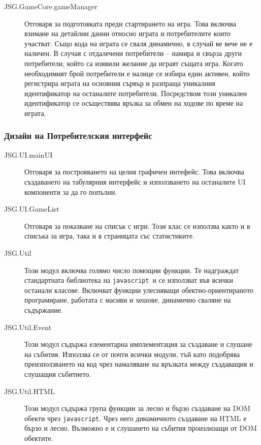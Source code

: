 \documentclass[a4paper]{article}
\def\js{\texttt{javascript}}
\begin{document}
\begin{description}
      \item[JSG.GameCore.gameManager] Отговаря за подготовката преди стартирането на игра. Това включва взимане на детайлни данни относно играта и потребителите които участват. Също кода на играта се сваля динамично, в случай ве вече не е наличен. В случая с отдалечени потребители -- намира и свърза други потребители, който са изявили желание да играят същата игра. Когато необходимият брой потребители е налице се избира един активен, който регистрира играта на основния сървър и разпраща уникалния идентификатор на останалите потребители. Посредством този уникален идентификатор се осъществява връзка за обмен на ходове по време на играта.
    \end{description}

  \subsubsection{Дизайн на Потребителския интерфейс}
  \begin{description}
    \item[JSG.UI.mainUI] Отговаря за построяването на целия графичен интефейс. Това включва създаването на табулярния интерфейс и използването на останалите UI компоненти за да го попълни.
    \item[JSG.UI.GameList] Отговаря за показване на списък с игри. Този клас се използва както и в списъка за игра, така и в страницата със статистиките.
  \end{description}

  \begin{description}
    \item[JSG.Util] Този модул включва голямо число помощни функции. Те надграждат стандартната библиотека на \js\ и се използват във всички останали класове. Включват функции улесняващи обектно-ориентираното програмиране, работата с масиви и хешове, динамично сваляне на съдържание.
    \item[JSG.Util.Event] Този модул съдържа елементарна имплементация за създаване и слушане на събития. Използва се от почти всички модули, тъй като подобрява преизползването на код чрез намаляване на връзката между създаващия и слушащия събитието.
    \item[JSG.Util.HTML] Този модул съдържа група функции за лесно и бързо създаване на DOM обекти чрез \js. Чрез него динамичното създаване на HTML е бързо и лесно. Възможно е и слушането на събития произлизащи от DOM обектите.
  \end{description}
\end{document}
